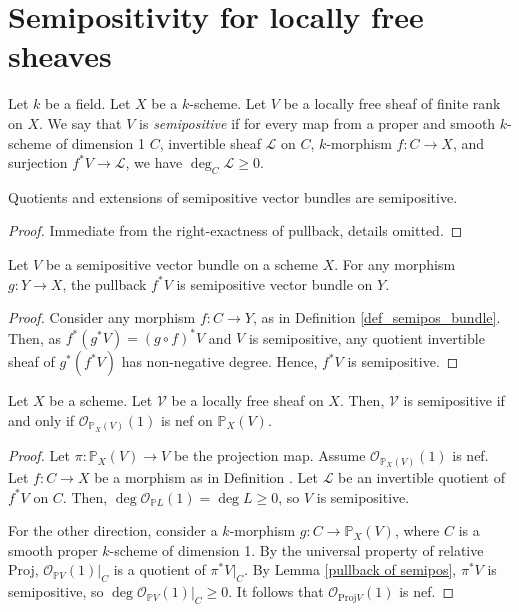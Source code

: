 \section{Semipositivity for locally free sheaves}

\begin{definition}\label{def_semipos_bundle}
Let $k$ be a field.
Let $X$ be a $k$-scheme.
Let $V$ be a locally free sheaf of finite rank on $X$.
We say that $V$ is \textit{semipositive} if for every map from a proper and smooth $k$-scheme of dimension 1 $C$, invertible sheaf $\mathcal{L}$ on $C$, $k$-morphism $f:C\to X$, and surjection $f^{*}V\to\mathcal{L}$, we have $\deg_C\mathcal{L}\ge0$.\end{definition}


\begin{lemma}
Quotients and extensions of semipositive vector bundles are semipositive.
\end{lemma}

\begin{proof}
Immediate from the right-exactness of pullback, details omitted.
\end{proof}


\begin{lemma}\label{pullback of semipos}
Let $V$ be a semipositive vector bundle on a scheme $X$. For any morphism $g:Y\to X$, the pullback $f^*V$ is semipositive vector bundle on $Y$.
\end{lemma}
\begin{proof}
Consider any morphism $f:C\to Y$, as in Definition \ref{def_semipos_bundle}. 
Then, as $f^*(g^*V)=(g\circ f)^*V$ and $V$ is semipositive, any quotient invertible sheaf of $g^*(f^*V)$ has non-negative degree. 
Hence, $f^*V$ is semipositive.
\end{proof}

\begin{lemma}\label{semipos=nef}
Let $X$ be a scheme.
Let $\mathcal{V}$ be a locally free sheaf on $X$.
Then, $\mathcal{V}$ is semipositive if and only if $\mathcal{O}_{\mathbb{P}_X(V)}(1)$ is nef on $\mathbb{P}_X(V)$.
\end{lemma}

\begin{proof}
Let $\pi:\mathbb{P}_X(V)\to V$ be the projection map. 
Assume $\mathcal{O}_{\mathbb{P}_X(V)}(1)$ is nef.
Let $f:C\to X$ be a morphism as in Definition \label{def_semipos_bundle}.
Let $\mathcal{L}$ be an invertible quotient of $f^*V$ on $C$. 
Then, $\deg \mathcal{O}_{\mathbb{P}L}(1)=\deg L\ge0$, so $V$ is semipositive.

For the other direction, consider a $k$-morphism $g:C\to\mathbb{P}_X(V)$, where $C$ is a smooth proper $k$-scheme of dimension 1.
By the universal property of relative Proj, $\mathcal{O}_{\mathbb{P}V}(1)|_C$ is a quotient of $\pi^*V|_C$. 
By Lemma \ref{pullback of semipos}, $\pi^*V$ is semipositive, so $\deg\mathcal{O}_{\mathbb{P}V}(1)|_C\geq 0$.
It follows that $\mathcal{O}_{\mathrm{Proj} V}(1)$ is nef.
\end{proof}



